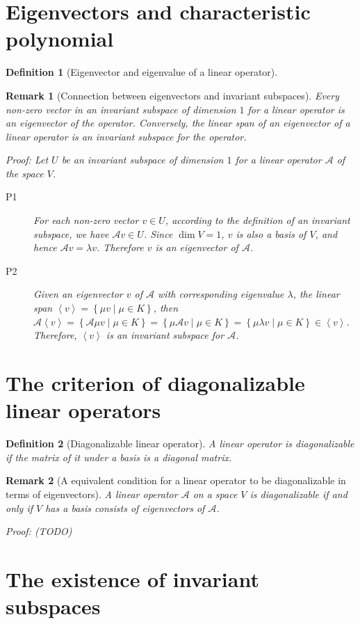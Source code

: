 \documentclass[onecolumn]{ctexart}
\newtheorem{definition}{Definition}
\newtheorem{remark}{Remark}
\begin{document}
\section{Eigenvectors and characteristic polynomial}

\begin{definition}[Eigenvector and eigenvalue of a linear operator]
  
\end{definition}

\begin{remark}[Connection between eigenvectors and invariant subspaces]
  Every non-zero vector in an invariant subspace of dimension $1$ for a linear 
  operator is an eigenvector of the operator. Conversely, the linear span of an 
  eigenvector of a linear operator is an invariant subspace for the operator.

  Proof: Let $U$ be an invariant subspace of dimension $1$ for a linear operator $\mathcal{A}$ of the space $V$.
  \begin{description}
    \item[P1] For each non-zero vector $v \in U$, according to the definition of 
    an invariant subspace, we have $\mathcal{A}v \in U$. Since $\dim V = 1$, $v$ 
    is also a basis of $V$, and hence $\mathcal{A}v = \lambda v$. Therefore $v$ 
    is an eigenvector of $\mathcal{A}$.
    \item[P2] Given an eigenvector $v$ of $\mathcal{A}$ with corresponding 
    eigenvalue $\lambda$, the linear span $\left\langle v \right\rangle = \left\{ 
    \mu v \mid \mu \in K \right\}$, then $\mathcal{A}\left\langle v \right\rangle 
    = \left\{ \mathcal{A} \mu v \mid \mu \in K\right\} = \left\{ \mu \mathcal{A} 
    v \mid \mu \in K\right\} =  \left\{ \mu \lambda v \mid \mu \in K\right\} \in 
    \left\langle v \right\rangle$. Therefore, $\left\langle v \right\rangle$ is 
    an invariant subspace for $\mathcal{A}$.
  \end{description}
\end{remark}

\section{The criterion of diagonalizable linear operators}

\begin{definition}[Diagonalizable linear operator]
  A linear operator is diagonalizable if the matrix of it under a basis is a diagonal matrix.
\end{definition}
\begin{remark}[A equivalent condition for a linear operator to be diagonalizable in terms of eigenvectors]
  A linear operator $\mathcal{A}$ on a space $V$ is diagonalizable if and only 
  if $V$ has a basis consists of eigenvectors of $\mathcal{A}$.

  Proof: (TODO)
\end{remark}

\section{The existence of invariant subspaces}
\end{document}
